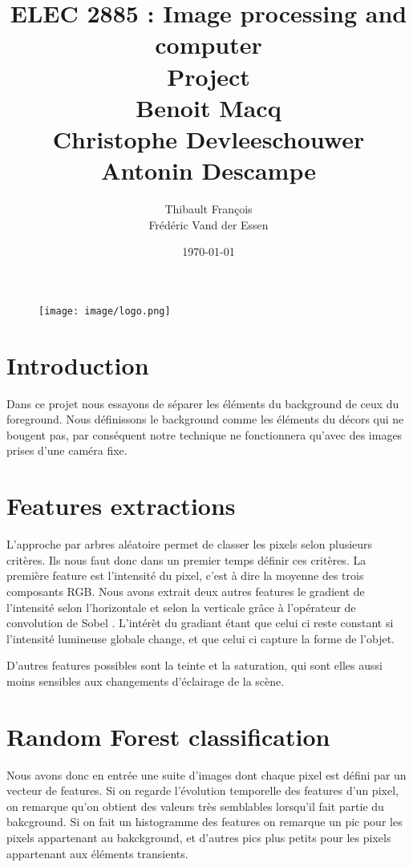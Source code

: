 \documentclass[11pt,a4paper]{report}
\title{ELEC 2885 : Image processing and computer  \\ Project \\
Benoit Macq \\ Christophe Devleeschouwer \\ Antonin Descampe}
\author{Thibault François \\ Frédéric Vand der Essen}
\date{\today}
\begin{document}
	\begin{titlepage}		
		\begin{figure}[tbp]
			\begin{center}
				\texttt{[image: image/logo.png]}
			\end{center}
		\end{figure}
		\maketitle
	\end{titlepage}

\section{Introduction}
Dans ce projet nous essayons de séparer les éléments du background de ceux du foreground. Nous définissons le background comme les éléments du décors
qui ne bougent pas, par conséquent notre technique ne fonctionnera qu'avec des images prises d'une caméra fixe. 

\section{Features extractions}
	L'approche par arbres aléatoire permet de classer les pixels selon plusieurs critères. Ils nous faut donc dans un premier temps définir ces critères. 
	La première feature est l'intensité du pixel, c'est à dire la moyenne des trois composants RGB. 
	Nous avons extrait deux autres features le gradient de l'intensité selon l'horizontale et selon la verticale \cite{gradient} 
	grâce à l'opérateur de convolution de Sobel \cite{sobel}. L'intérèt du gradiant étant que celui ci reste constant si l'intensité lumineuse globale change,
	et que celui ci capture la forme de l'objet. 

	D'autres features possibles sont la teinte et la saturation, qui sont elles aussi moins sensibles aux changements d'éclairage de la scène. \cite{hsv} 

\section{Random Forest classification}

	Nous avons donc en entrée une suite d'images dont chaque pixel est défini par un vecteur de features.
	Si on regarde l'évolution temporelle des features d'un pixel, on remarque qu'on obtient des valeurs très
	semblables lorsqu'il fait partie du bakcground. Si on fait un histogramme des features on remarque un pic
	pour les pixels appartenant au bakckground, et d'autres pics plus petits pour les pixels appartenant aux
	éléments transients. 
\end{document}
